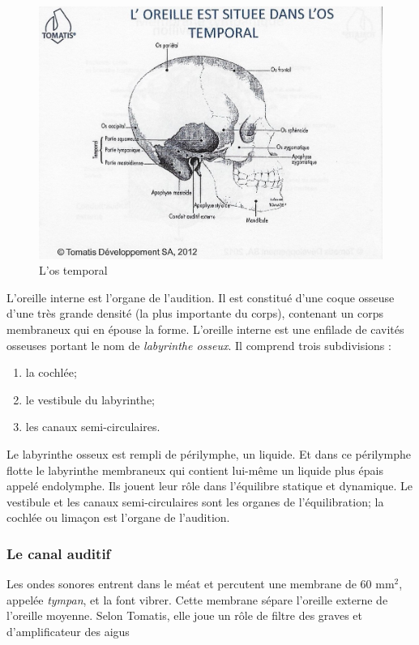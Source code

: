 \begin{figure}
	\centering
	\includegraphics[width=0.7\linewidth]{images/Loreilleostemporal_crane.jpg}
	\caption[L'os temporal]{L'os temporal}
	\label{fig:loreilleostemporal18}
\end{figure}

L'oreille interne est l'organe de l'audition. Il
est constitué d'une coque osseuse d'une très grande densité (la plus
importante du corps), contenant un corps membraneux qui en épouse
la forme. 
L'oreille interne est une enfilade de cavités osseuses portant 
le nom de \emph{labyrinthe osseux}. Il comprend trois subdivisions : 
\begin{enumerate}
	\item la cochlée;
	\item le vestibule du labyrinthe;
	\item  les canaux semi-circulaires.
\end{enumerate}

Le labyrinthe
osseux est rempli de périlymphe, un liquide. Et dans ce périlymphe
flotte le labyrinthe membraneux qui contient lui-même un liquide
plus épais appelé endolymphe. Ils jouent leur rôle dans l'équilibre
statique et dynamique. Le vestibule et les canaux semi-circulaires
sont les organes de l'équilibration; la cochlée ou
limaçon est l'organe de l'audition. 

\subsubsection{Le canal auditif}

Les ondes sonores entrent dans le méat et percutent
une membrane de 60 mm$^2$, appelée \emph{tympan}, et la font vibrer. Cette membrane
sépare l'oreille externe de l'oreille moyenne. Selon Tomatis, elle
joue un rôle de filtre des graves et d'amplificateur des aigus

